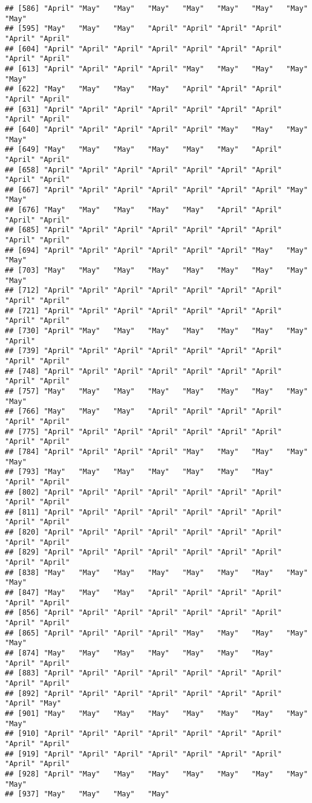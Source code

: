 \documentclass[
]{article}
\begin{document}
\begin{verbatim}
## [586] "April" "May"   "May"   "May"   "May"   "May"   "May"   "May"   "May"  
## [595] "May"   "May"   "May"   "April" "April" "April" "April" "April" "April"
## [604] "April" "April" "April" "April" "April" "April" "April" "April" "April"
## [613] "April" "April" "April" "April" "May"   "May"   "May"   "May"   "May"  
## [622] "May"   "May"   "May"   "May"   "April" "April" "April" "April" "April"
## [631] "April" "April" "April" "April" "April" "April" "April" "April" "April"
## [640] "April" "April" "April" "April" "April" "May"   "May"   "May"   "May"  
## [649] "May"   "May"   "May"   "May"   "May"   "May"   "April" "April" "April"
## [658] "April" "April" "April" "April" "April" "April" "April" "April" "April"
## [667] "April" "April" "April" "April" "April" "April" "April" "May"   "May"  
## [676] "May"   "May"   "May"   "May"   "May"   "April" "April" "April" "April"
## [685] "April" "April" "April" "April" "April" "April" "April" "April" "April"
## [694] "April" "April" "April" "April" "April" "April" "May"   "May"   "May"  
## [703] "May"   "May"   "May"   "May"   "May"   "May"   "May"   "May"   "May"  
## [712] "April" "April" "April" "April" "April" "April" "April" "April" "April"
## [721] "April" "April" "April" "April" "April" "April" "April" "April" "April"
## [730] "April" "May"   "May"   "May"   "May"   "May"   "May"   "May"   "April"
## [739] "April" "April" "April" "April" "April" "April" "April" "April" "April"
## [748] "April" "April" "April" "April" "April" "April" "April" "April" "April"
## [757] "May"   "May"   "May"   "May"   "May"   "May"   "May"   "May"   "May"  
## [766] "May"   "May"   "May"   "April" "April" "April" "April" "April" "April"
## [775] "April" "April" "April" "April" "April" "April" "April" "April" "April"
## [784] "April" "April" "April" "April" "May"   "May"   "May"   "May"   "May"  
## [793] "May"   "May"   "May"   "May"   "May"   "May"   "May"   "April" "April"
## [802] "April" "April" "April" "April" "April" "April" "April" "April" "April"
## [811] "April" "April" "April" "April" "April" "April" "April" "April" "April"
## [820] "April" "April" "April" "April" "April" "April" "April" "April" "April"
## [829] "April" "April" "April" "April" "April" "April" "April" "April" "April"
## [838] "May"   "May"   "May"   "May"   "May"   "May"   "May"   "May"   "May"  
## [847] "May"   "May"   "May"   "April" "April" "April" "April" "April" "April"
## [856] "April" "April" "April" "April" "April" "April" "April" "April" "April"
## [865] "April" "April" "April" "April" "May"   "May"   "May"   "May"   "May"  
## [874] "May"   "May"   "May"   "May"   "May"   "May"   "May"   "April" "April"
## [883] "April" "April" "April" "April" "April" "April" "April" "April" "April"
## [892] "April" "April" "April" "April" "April" "April" "April" "April" "May"  
## [901] "May"   "May"   "May"   "May"   "May"   "May"   "May"   "May"   "May"  
## [910] "April" "April" "April" "April" "April" "April" "April" "April" "April"
## [919] "April" "April" "April" "April" "April" "April" "April" "April" "April"
## [928] "April" "May"   "May"   "May"   "May"   "May"   "May"   "May"   "May"  
## [937] "May"   "May"   "May"   "May"
\end{verbatim}
\end{document}

